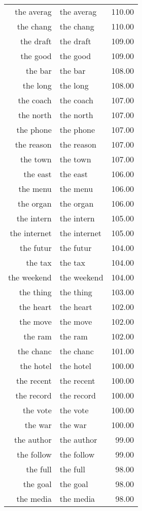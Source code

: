 \begin{table}[ht]
\begin{tabular}{rlr}
  the averag & the averag & 110.00 \\ 
  the chang & the chang & 110.00 \\ 
  the draft & the draft & 109.00 \\ 
  the good & the good & 109.00 \\ 
  the bar & the bar & 108.00 \\ 
  the long & the long & 108.00 \\ 
  the coach & the coach & 107.00 \\ 
  the north & the north & 107.00 \\ 
  the phone & the phone & 107.00 \\ 
  the reason & the reason & 107.00 \\ 
  the town & the town & 107.00 \\ 
  the east & the east & 106.00 \\ 
  the menu & the menu & 106.00 \\ 
  the organ & the organ & 106.00 \\ 
  the intern & the intern & 105.00 \\ 
  the internet & the internet & 105.00 \\ 
  the futur & the futur & 104.00 \\ 
  the tax & the tax & 104.00 \\ 
  the weekend & the weekend & 104.00 \\ 
  the thing & the thing & 103.00 \\ 
  the heart & the heart & 102.00 \\ 
  the move & the move & 102.00 \\ 
  the ram & the ram & 102.00 \\ 
  the chanc & the chanc & 101.00 \\ 
  the hotel & the hotel & 100.00 \\ 
  the recent & the recent & 100.00 \\ 
  the record & the record & 100.00 \\ 
  the vote & the vote & 100.00 \\ 
  the war & the war & 100.00 \\ 
  the author & the author & 99.00 \\ 
  the follow & the follow & 99.00 \\ 
  the full & the full & 98.00 \\ 
  the goal & the goal & 98.00 \\ 
  the media & the media & 98.00 \\ 

\end{tabular}
\end{table}
